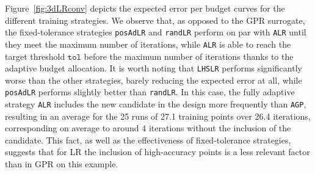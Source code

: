 Figure~\ref{fig:3dLRconv} depicts the expected error per budget curves for the different training strategies. 
We observe that, as opposed to the GPR surrogate, the fixed-tolerance strategies \texttt{posAdLR} and \texttt{randLR} perform on par with \texttt{ALR} until they meet the maximum number of iterations, while \texttt{ALR} is able to reach the target threshold $\texttt{tol}$ before the maximum number of iterations thanks to the adaptive budget allocation.
It is worth noting that \texttt{LHSLR} performs significantly worse than the other strategies, barely reducing the expected error at all, while \texttt{posAdLR} performs slightly better than \texttt{randLR}. 
In this case, the fully adaptive strategy \texttt{ALR} includes the new candidate in the design more frequently than \texttt{AGP}, resulting in an average for the 25 runs of 27.1 training points over 26.4 iterations, corresponding on average to around 4 iterations without the inclusion of the candidate.
This fact, as well as the effectiveness of fixed-tolerance strategies, suggests that for LR the inclusion of high-accuracy points is a less relevant factor than in GPR on this example. \medskip

